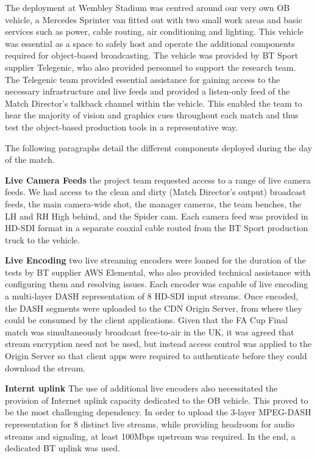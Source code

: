 \documentclass[sigchi-a, authorversion]{acmart}
\begin{document}
The deployment at Wembley Stadium was centred around our very own OB vehicle, a Mercedes Sprinter van fitted out with two small work areas and basic services such as power, cable routing, air conditioning and lighting. This vehicle was essential as a space to safely host and operate the additional components required for object-based broadcasting. The vehicle was provided by BT Sport supplier Telegenic, who also provided personnel to support the research team. The Telegenic team provided essential assistance for gaining access to the necessary infrastructure and live feeds and provided a listen-only feed of the Match Director's talkback channel within the vehicle. This enabled the team to hear the majority of vision and graphics cues throughout each match and thus test the object-based production tools in a representative way.

The following paragraphs detail the different components deployed during the day of the match.

\textbf{Live Camera Feeds} the project team requested access to a range of live camera feeds. We had access to the clean and dirty (Match Director's output) broadcast feeds, the main camera-wide shot, the manager cameras, the team benches, the LH and RH High behind, and the Spider cam. Each camera feed was provided in HD-SDI format in a separate coaxial cable routed from the BT Sport production truck to the vehicle.

\textbf{Live Encoding} two live streaming encoders were loaned for the duration of the tests by BT supplier AWS Elemental, who also provided technical assistance with configuring them and resolving issues. Each encoder was capable of live encoding a multi-layer DASH representation of 8 HD-SDI input streams. Once encoded, the DASH segments were uploaded to the CDN Origin Server, from where they could be consumed by the client applications. Given that the FA Cup Final match was simultaneously broadcast free-to-air in the UK, it was agreed that stream encryption need not be used, but instead access control was applied to the Origin Server so that client apps were required to authenticate before they could download the stream.  

\textbf{Internt uplink} The use of additional live encoders also necessitated the provision of Internet uplink capacity dedicated to the OB vehicle. This proved to be the most challenging dependency. In order to upload the 3-layer MPEG-DASH representation for 8 distinct live streams, while providing headroom for audio streams and signaling, at least 100Mbps upstream was required. In the end, a dedicated BT uplink was used.
\end{document}
